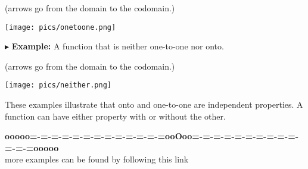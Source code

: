 \documentclass{ximera}
\begin{document}
\begin{center}
(arrows go from the domain to the codomain.)
\begin{image}
\texttt{[image: pics/onetoone.png]}
\end{image}
\end{center}






$\blacktriangleright$ \textbf{Example:} A function that is neither one-to-one nor onto.  \\

\begin{center}
(arrows go from the domain to the codomain.)
\begin{image}
\texttt{[image: pics/neither.png]}
\end{image}
\end{center}




These examples illustrate that onto and one-to-one are independent properties.  A function can have either property with or without the other.
















\begin{center}
\textbf{\textcolor{green!50!black}{ooooo=-=-=-=-=-=-=-=-=-=-=-=-=ooOoo=-=-=-=-=-=-=-=-=-=-=-=-=ooooo}} \\

more examples can be found by following this link\\ 

\end{center}
\end{document}
